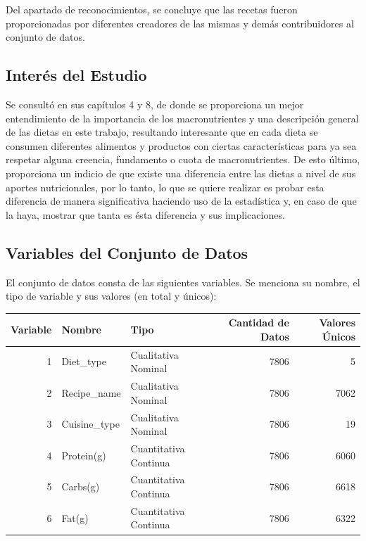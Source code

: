 \documentclass[12pt,a4paper]{article}
\begin{document}
        Del apartado de reconocimientos, se concluye que las recetas fueron 
        proporcionadas por diferentes creadores de las mismas y demás contribuidores 
        al conjunto de datos. 

    \subsection{Interés del Estudio}

        Se consultó \cite{marvastipopular} en sus 
        capítulos 4 y 8, de donde se proporciona un mejor entendimiento de la 
        importancia de los macronutrientes y una descripción general de las 
        dietas en este trabajo, resultando interesante que en cada dieta se 
        consumen diferentes alimentos y productos con ciertas características 
        para ya sea respetar alguna creencia, fundamento o cuota de macronutrientes. 
        De esto último, proporciona un indicio de que existe una diferencia entre 
        las dietas a nivel de sus aportes nutricionales, por lo tanto, lo que se 
        quiere realizar es probar esta diferencia de manera significativa haciendo 
        uso de la estadística y, en caso de que la haya, mostrar que tanta es ésta 
        diferencia y sus implicaciones.

    \subsection{Variables del Conjunto de Datos}

        El conjunto de datos consta de las siguientes variables. Se menciona su 
        nombre, el tipo de variable y sus valores (en total y únicos):

        \begin{center}
            \begin{tabular}{r|llrr}
                \toprule
                    Variable & Nombre & Tipo & Cantidad de Datos & Valores Únicos\\
                \midrule
                    1 & Diet\_type & Cualitativa Nominal & 7806 & 5 \\
                    2 & Recipe\_name & Cualitativa Nominal & 7806 & 7062\\
                    3 & Cuisine\_type & Cualitativa Nominal & 7806 & 19\\
                    4 & Protein(g) & Cuantitativa Continua & 7806 & 6060\\
                    5 & Carbs(g) & Cuantitativa Continua & 7806 & 6618\\
                    6 & Fat(g) & Cuantitativa Continua & 7806 & 6322\\
                \bottomrule
            \end{tabular}
        \end{center}
\end{document}
